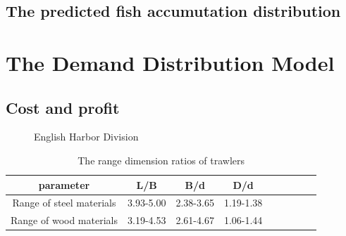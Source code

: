 \documentclass{mcmthesis}
\begin{document}
  \subsection{The predicted fish accumutation distribution}


\section{The Demand Distribution Model}
\subsection{Cost and profit}
\begin{figure}[h]
  \caption{English Harbor Division}\label{figure1}
\end{figure}

\begin{table}[!htb]
\centering
\setlength{\abovecaptionskip}{0pt}%
\setlength{\belowcaptionskip}{15pt}%
\caption{The range dimension ratios of  trawlers}
\begin{tabular}{ccccccccc}
\toprule[1.5pt]
parameter &L/B&B/d&D/d\\
\toprule[1.5pt]
Range of steel materials&3.93-5.00&2.38-3.65&1.19-1.38\\
Range of wood materials&3.19-4.53&2.61-4.67&1.06-1.44\\
\bottomrule[1.5pt]
\end{tabular}
\end{table}
\end{document}

